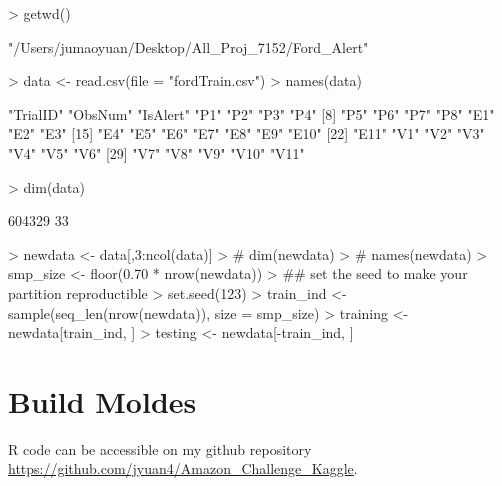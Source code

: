 \documentclass[11pt]{article}
\begin{document}
\begin{Schunk}
\begin{Sinput}
> getwd()
\end{Sinput}
\begin{Soutput}
[1] "/Users/jumaoyuan/Desktop/All_Proj_7152/Ford_Alert"
\end{Soutput}
\begin{Sinput}
> data <- read.csv(file = "fordTrain.csv")
> names(data)
\end{Sinput}
\begin{Soutput}
 [1] "TrialID" "ObsNum"  "IsAlert" "P1"      "P2"      "P3"      "P4"     
 [8] "P5"      "P6"      "P7"      "P8"      "E1"      "E2"      "E3"     
[15] "E4"      "E5"      "E6"      "E7"      "E8"      "E9"      "E10"    
[22] "E11"     "V1"      "V2"      "V3"      "V4"      "V5"      "V6"     
[29] "V7"      "V8"      "V9"      "V10"     "V11"    
\end{Soutput}
\begin{Sinput}
> dim(data)
\end{Sinput}
\begin{Soutput}
[1] 604329     33
\end{Soutput}
\begin{Sinput}
> newdata <- data[,3:ncol(data)]
> # dim(newdata)
> # names(newdata)
> smp_size <- floor(0.70 * nrow(newdata))
> ## set the seed to make your partition reproductible
> set.seed(123)
> train_ind <- sample(seq_len(nrow(newdata)), size = smp_size)
> training <- newdata[train_ind, ]
> testing <- newdata[-train_ind, ]
\end{Sinput}
\end{Schunk}

\section{Build Moldes}
R code can be accessible on my github repository \url{https://github.com/jyuan4/Amazon_Challenge_Kaggle}.

\end{document}
